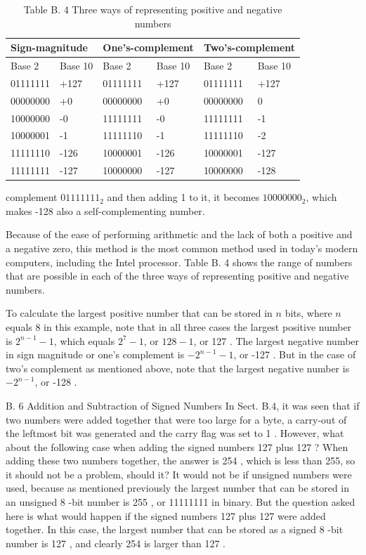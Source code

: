 \documentclass[10pt]{book}
\begin{document}
\begin{table}[htbp]
\begin{center}
\captionsetup{labelformat=empty}
\caption{Table B. 4 Three ways of representing positive and negative numbers}
\begin{tabular}{|l|l|l|l|l|l|}
\hline
\multicolumn{2}{|l|}{Sign-magnitude} & \multicolumn{2}{|l|}{One's-complement} & \multicolumn{2}{|l|}{Two's-complement} \\
\hline
Base 2 & Base 10 & Base 2 & Base 10 & Base 2 & Base 10 \\
\hline
01111111 & +127 & 01111111 & +127 & 01111111 & +127 \\
\hline
00000000 & +0 & 00000000 & +0 & 00000000 & 0 \\
\hline
10000000 & -0 & 11111111 & -0 & 11111111 & -1 \\
\hline
10000001 & -1 & 11111110 & -1 & 11111110 & -2 \\
\hline
11111110 & -126 & 10000001 & -126 & 10000001 & -127 \\
\hline
11111111 & -127 & 10000000 & -127 & 10000000 & -128 \\
\hline
\end{tabular}
\end{center}
\end{table}

complement $01111111_{2}$ and then adding 1 to it, it becomes $10000000_{2}$, which makes -128 also a self-complementing number.

Because of the ease of performing arithmetic and the lack of both a positive and a negative zero, this method is the most common method used in today's modern computers, including the Intel processor. Table B. 4 shows the range of numbers that are possible in each of the three ways of representing positive and negative numbers.

To calculate the largest positive number that can be stored in $n$ bits, where $n$ equals 8 in this example, note that in all three cases the largest positive number is $2^{n-1}-1$, which equals $2^{7}-1$, or $128-1$, or 127 . The largest negative number in sign magnitude or one's complement is $-2^{n-1}-1$, or -127 . But in the case of two's complement as mentioned above, note that the largest negative number is $-2^{n-1}$, or -128 .

B. 6 Addition and Subtraction of Signed Numbers
In Sect. B.4, it was seen that if two numbers were added together that were too large for a byte, a carry-out of the leftmost bit was generated and the carry flag was set to 1 . However, what about the following case when adding the signed numbers 127 plus 127 ? When adding these two numbers together, the answer is 254 , which is less than 255, so it should not be a problem, should it? It would not be if unsigned numbers were used, because as mentioned previously the largest number that can be stored in an unsigned 8 -bit number is 255 , or 11111111 in binary. But the question asked here is what would happen if the signed numbers 127 plus 127 were added together. In this case, the largest number that can be stored as a signed 8 -bit number is 127 , and clearly 254 is larger than 127 .
\end{document}
